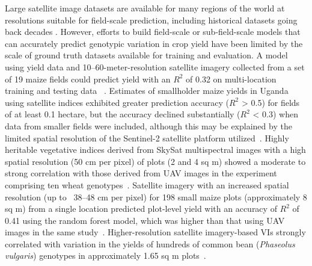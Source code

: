 \documentclass[12pt,twoside]{gsag3jnl}
\begin{document}
Large satellite image datasets are available for many regions of the world at resolutions suitable for field-scale prediction, including historical datasets going back decades \citep{30m-china, peng2023twenty}. However, efforts to build field-scale or sub-field-scale models that can accurately predict genotypic variation in crop yield have been limited by the scale of ground truth datasets available for training and evaluation. A model using yield data and 10--60-meter-resolution satellite imagery collected from a set of 19 maize fields could predict yield with an $R^2$ of 0.32 on multi-location training and testing data ~\citep{schwalbert2018forecasting}. Estimates of smallholder maize yields in Uganda using satellite indices exhibited greater prediction accuracy ($R^2$ > 0.5) for fields of at least 0.1 hectare, but the accuracy declined substantially ($R^2$ < 0.3) when data from smaller fields were included, although this may be explained by the limited spatial resolution of the Sentinel-2 satellite platform utilized~\citep{lobell2020eyes}. Highly heritable vegetative indices derived from SkySat multispectral images with a high spatial resolution (50 cm per pixel) of plots (2 and 4 sq m) showed a moderate to strong correlation with those derived from UAV images in the experiment comprising ten wheat genotypes~\citep{pinto2023satellite}. Satellite imagery with an increased spatial resolution (up to ~38--48 cm per pixel) for 198 small maize plots (approximately 8 sq m) from a single location predicted plot-level yield with an accuracy of $R^2$ of 0.41 using the random forest model, which was higher than that using UAV images in the same study~\citep{sankaran2021can}. Higher-resolution satellite imagery-based VIs strongly correlated with variation in the yields of hundreds of common bean (\textit{Phaseolus vulgaris}) genotypes in approximately 1.65 sq m plots~\citep{sankaran2019unmanned}.
\end{document}
